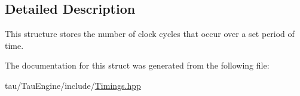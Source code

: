 \subsection{Detailed Description}
This structure stores the number of clock cycles that occur over a set period of time. 

The documentation for this struct was generated from the following file\+:\begin{DoxyCompactItemize}
\item 
tau/\+Tau\+Engine/include/\mbox{\hyperlink{_timings_8hpp}{Timings.\+hpp}}\end{DoxyCompactItemize}
